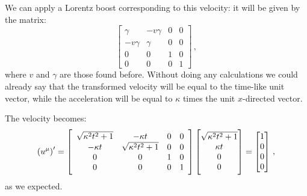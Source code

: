 \documentclass[main.tex]{subfiles}
\begin{document}
We can apply a Lorentz boost corresponding to this velocity:
it will be given by the matrix:
%
\begin{equation}
  \left[\begin{array}{cccc}
  \gamma  & -v \gamma  & 0 & 0 \\ 
  -v \gamma  & \gamma  & 0 & 0 \\ 
  0 & 0 & 1 & 0 \\ 
  0 & 0 & 0 & 1
  \end{array}\right]
\,,
\end{equation}
%
where \(v\) and \(\gamma \) are those found before.
Without doing any calculations we could already say that the transformed velocity will be equal to the time-like unit vector, while the acceleration will be equal to \(\kappa \) times the unit \(x\)-directed vector.

The velocity becomes:
%
\begin{equation}
  \qty(u^{\mu})' =
  \left[\begin{array}{cccc}
    \sqrt{\kappa^2 t^2 + 1}  & -\kappa t  & 0 & 0 \\ 
    -\kappa t  & \sqrt{\kappa^2 t^2 + 1}  & 0 & 0 \\ 
    0 & 0 & 1 & 0 \\ 
    0 & 0 & 0 & 1
    \end{array}\right]
    \begin{bmatrix}
      \sqrt{\kappa^2 t^2 + 1}  \\
      \kappa t \\
      0 \\
      0
    \end{bmatrix} 
  = 
  \begin{bmatrix}
  1 \\
  0 \\
  0 \\
  0
  \end{bmatrix}
\,,
\end{equation}
%
as we expected.
\end{document}
